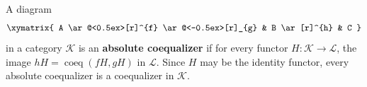 A diagram
$$\xymatrix{
A \ar@<0.5ex>[r]^{f} \ar@<-0.5ex>[r]_{g} & B \ar[r]^{h} & C
}$$
in a category $\mathcal{K}$ is an \textbf{absolute coequalizer} if for every functor $H: \mathcal{K} \to \mathcal{L}$, the image $hH = \operatorname{coeq}(fH, gH)$ in $\mathcal{L}$. Since $H$ may be the identity functor, every absolute coequalizer is a coequalizer in $\mathcal{K}$.
